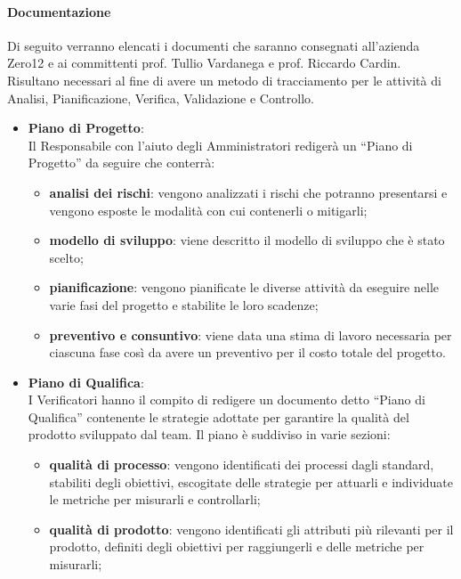 			\paragraph{Documentazione}
				Di seguito verranno elencati i documenti che saranno consegnati all’azienda Zero12 e ai committenti prof. Tullio Vardanega e prof. Riccardo Cardin. Risultano necessari al fine di avere un metodo di tracciamento per le attività di Analisi, Pianificazione, Verifica, Validazione e Controllo.\\
				\begin{itemize}
					\item\textbf{Piano di Progetto}:\\
						Il Responsabile con l’aiuto degli Amministratori redigerà un “Piano di Progetto” da seguire che conterrà: \\
						\begin{itemize}
							\item\textbf{analisi dei rischi}: vengono analizzati i rischi che potranno presentarsi e vengono esposte le modalità con cui contenerli o mitigarli;
							\item\textbf{modello di sviluppo}: viene descritto il modello di sviluppo che è stato scelto;
							\item\textbf{pianificazione}: vengono pianificate le diverse attività da eseguire nelle varie fasi del progetto e stabilite le loro scadenze;
							\item\textbf{preventivo e consuntivo}: viene data una stima di lavoro necessaria per ciascuna fase così da avere un preventivo per il costo totale del progetto.
						\end{itemize}
					\item\textbf{Piano di Qualifica}:\\
						I Verificatori hanno il compito di redigere un documento detto “Piano di Qualifica” contenente le strategie adottate per garantire la qualità del prodotto sviluppato dal team.
						Il piano è suddiviso in varie sezioni:
						\begin{itemize}
							\item\textbf{qualità di processo}: vengono identificati dei processi dagli standard, stabiliti degli obiettivi, escogitate delle strategie per attuarli e individuate le metriche per misurarli e controllarli;
							\item\textbf{qualità di prodotto}: vengono identificati gli attributi più rilevanti per il prodotto, definiti degli obiettivi per raggiungerli e delle metriche per misurarli;

\end{itemize}
\end{itemize}
